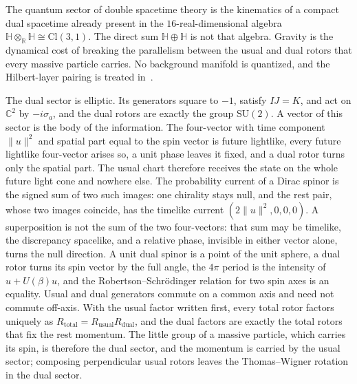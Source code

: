 \documentclass[a4paper]{article}
\begin{document}
The quantum sector of double spacetime theory is the kinematics of a compact dual spacetime already present in the $16$-real-dimensional algebra $\mathbb{H}\otimes_{\mathbb{R}}\mathbb{H}\cong\mathrm{Cl}(3,1)$. The direct sum $\mathbb{H}\oplus\mathbb{H}$ is not that algebra. Gravity is the dynamical cost of breaking the parallelism between the usual and dual rotors that every massive particle carries. No background manifold is quantized, and the Hilbert-layer pairing is treated in~\cite{dst-d4l}.

The dual sector is elliptic. Its generators square to $-1$, satisfy $IJ=K$, and act on $\mathbb{C}^2$ by $-i\sigma_a$, and the dual rotors are exactly the group $\mathrm{SU}(2)$. A vector of this sector is the body of the information. The four-vector with time component $\lVert u\rVert^2$ and spatial part equal to the spin vector is future lightlike, every future lightlike four-vector arises so, a unit phase leaves it fixed, and a dual rotor turns only the spatial part. The usual chart therefore receives the state on the whole future light cone and nowhere else. The probability current of a Dirac spinor is the signed sum of two such images: one chirality stays null, and the rest pair, whose two images coincide, has the timelike current $(2\lVert u\rVert^2,0,0,0)$. A superposition is not the sum of the two four-vectors: that sum may be timelike, the discrepancy spacelike, and a relative phase, invisible in either vector alone, turns the null direction. A unit dual spinor is a point of the unit sphere, a dual rotor turns its spin vector by the full angle, the $4\pi$ period is the intensity of $u+U(\beta)u$, and the Robertson--Schrödinger relation for two spin axes is an equality. Usual and dual generators commute on a common axis and need not commute off-axis. With the usual factor written first, every total rotor factors uniquely as $R_{\mathrm{total}}=R_{\mathrm{usual}}R_{\mathrm{dual}}$, and the dual factors are exactly the total rotors that fix the rest momentum. The little group of a massive particle, which carries its spin, is therefore the dual sector, and the momentum is carried by the usual sector; composing perpendicular usual rotors leaves the Thomas--Wigner rotation in the dual sector.
\end{document}
